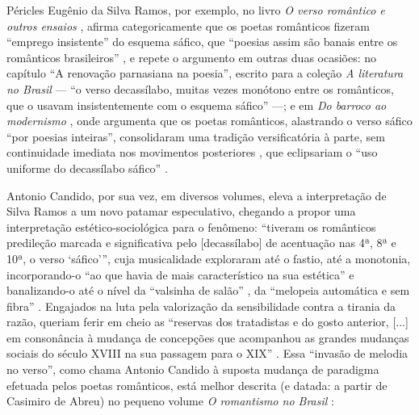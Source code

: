 \documentclass[portuguese]{textolivre}
\begin{document}
Péricles Eugênio da Silva Ramos, por exemplo, no livro \textit{O verso romântico e outros ensaios} \cite[p.~9]{ramos1959verso}, afirma categoricamente que os poetas românticos fizeram “emprego insistente” do esquema sáfico, que “poesias assim são banais entre os românticos brasileiros” \cite[p.~26]{ramos1959verso}, e repete o argumento em outras duas ocasiões: no capítulo “A renovação parnasiana na poesia”, escrito para a coleção \textit{A literatura no Brasil} — “o verso decassílabo, muitas vezes monótono entre os românticos, que o usavam insistentemente com o esquema sáfico” \cite[p.~128]{ramos1969renovacao} —; e em \textit{Do barroco ao modernismo} \cite{ramos1968barroco}, onde argumenta que os poetas românticos, alastrando o verso sáfico “por poesias inteiras”, consolidaram uma tradição versificatória à parte, sem continuidade imediata nos movimentos posteriores \cite[p.~74]{ramos1968barroco}, que eclipsariam o “uso uniforme do decassílabo sáfico” \cite[p.~162]{ramos1989introducao}.

Antonio Candido, por sua vez, em diversos volumes, eleva a interpretação de Silva Ramos a um novo patamar especulativo, chegando a propor uma interpretação estético-sociológica para o fenômeno: “tiveram os românticos predileção marcada e significativa pelo [decassílabo] de acentuação nas 4ª, 8ª e 10ª, o verso ‘sáfico’”, cuja musicalidade exploraram até o fastio, até a monotonia, incorporando-o “ao que havia de mais característico na sua estética” e banalizando-o até o nível da “valsinha de salão” \cite[p.~36]{candido2000formacao}, da “melopeia automática e sem fibra” \cite[p.~221]{candido2000formacao}. Engajados na luta pela valorização da sensibilidade contra a tirania da razão, queriam ferir em cheio as “reservas dos tratadistas e do gosto anterior, [...] em consonância à mudança de concepções que acompanhou as grandes mudanças sociais do século XVIII na sua passagem para o XIX” \cite[p.~56]{candido1996estudo}. Essa “invasão de melodia no verso”, como chama Antonio Candido à suposta mudança de paradigma efetuada pelos poetas românticos, está melhor descrita (e datada: a partir de Casimiro de Abreu) no pequeno volume \textit{O romantismo no Brasil} \cite[p.~64-65]{candido2002romantismo}:
\end{document}
